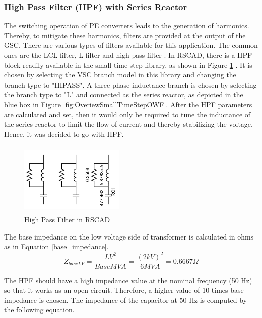 \subsubsection{High Pass Filter (HPF) with Series Reactor}\label{HPF_design}
The switching operation of \gls{PE} converters leads to the generation of harmonics. Thereby, to mitigate these harmonics, filters are provided at the output of the \gls{GSC}. There are various types of filters available for this application. The common ones are the LCL filter, L filter and high pass filter \cite{beres_review_2016}. In RSCAD, there is a \gls{HPF} block readily available in the small time step library, as shown in Figure \ref{fig:HPF} \cite{rtds_tech}. It is chosen by selecting the \gls{VSC} branch model in this library and changing the branch type to "HIPASS". A three-phase inductance branch is chosen by selecting the branch type to "L" and connected as the series reactor, as depicted in the blue box in Figure \ref{fig:OveriewSmallTimeStepOWF}. After the \gls{HPF} parameters are calculated and set, then it would only be required to tune the inductance of the series reactor to limit the flow of current and thereby stabilizing the voltage. Hence, it was decided to go with \gls{HPF}.

\begin{figure}[H]
\centering
    \includegraphics[height = 3.5cm,width = 5cm]{Diagrams/Chapter_3/HPF_RSCAD.PNG}
    \caption{High Pass Filter in RSCAD}
    \label{fig:HPF}
\end{figure}

The base impedance on the low voltage side of transformer is calculated in ohms as in Equation \ref{base_impedance}.
\begin{equation}\label{base_impedance}
    Z_{baseLV} = \frac{LV^2}{Base MVA} = \frac{(2 kV)^2}{6 MVA} = 0.6667\Omega  
\end{equation}

The \gls{HPF} should have a high impedance value at the nominal frequency (50 Hz) so that it works as an open circuit. Therefore, a higher value of 10 times base impedance is chosen. The impedance of the capacitor at 50 Hz is computed by the following equation.


